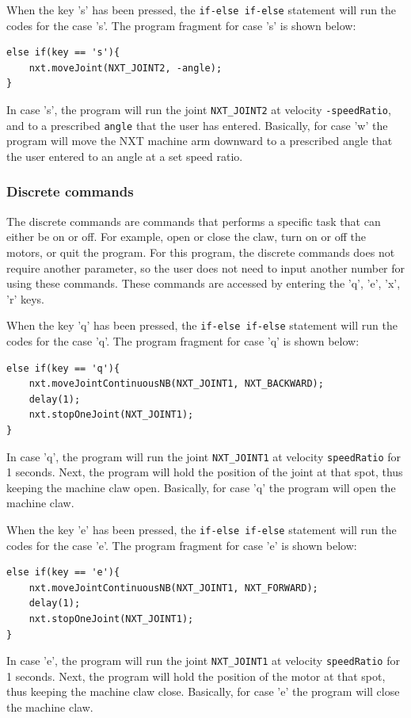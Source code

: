 \documentclass[11pt]{article}
\begin{document}
When the key 's' has been pressed, the \verb+if-else if-else+ statement will run the codes for the case 's'.
The program fragment for case 's' is shown below:
\begin{verbatim} 
else if(key == 's'){
    nxt.moveJoint(NXT_JOINT2, -angle);
}
\end{verbatim}
In case 's', the program will run the joint \verb+NXT_JOINT2+ at velocity \verb+-speedRatio+,
and to a prescribed \verb+angle+ that the user has entered. Basically, for case 'w' the program will 
move the NXT machine arm downward to a prescribed angle that the user entered to an angle at a set speed ratio.\\

\subsubsection*{Discrete commands}
The discrete commands are commands that performs a specific task that can either be on or off.
For example, open or close the claw, turn on or off the motors, or quit the program.
For this program, the discrete commands does not require another parameter, so the user does not need to
input another number for using these commands. These commands are accessed by entering the 'q', 'e', 'x', 'r' keys.\\
\newline

When the key 'q' has been pressed, the \verb+if-else if-else+ statement will run the codes for the case 'q'.
The program fragment for case 'q' is shown below:
\begin{verbatim} 
else if(key == 'q'){
    nxt.moveJointContinuousNB(NXT_JOINT1, NXT_BACKWARD);
    delay(1);
    nxt.stopOneJoint(NXT_JOINT1);
}
\end{verbatim}
In case 'q', the program will run the joint \verb+NXT_JOINT1+ at velocity \verb+speedRatio+ for 1 seconds. Next, 
the program will hold the position of the joint at that spot, thus keeping the machine claw open. Basically, for 
case 'q' the program will open the machine claw.\\
\newline

When the key 'e' has been pressed, the \verb+if-else if-else+ statement will run the codes for the case 'e'.
The program fragment for case 'e' is shown below:
\begin{verbatim} 
else if(key == 'e'){
    nxt.moveJointContinuousNB(NXT_JOINT1, NXT_FORWARD);
    delay(1);
    nxt.stopOneJoint(NXT_JOINT1);
}
\end{verbatim}
In case 'e', the program will run the joint \verb+NXT_JOINT1+ at velocity \verb+speedRatio+ for 1 seconds. Next, 
the program will hold the position of the motor at that spot, thus keeping the machine claw close. Basically, for 
case 'e' the program will close the machine claw.
\end{document}
